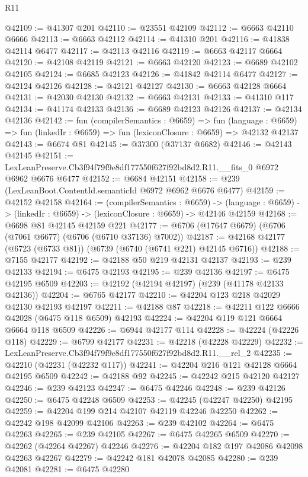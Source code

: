 \begin{lexlean}{R11}
\begin{coremodule}
@42109 := @41307 @201
@42110 := @23551 @42109
@42112 := @6663 @42110 @6666
@42113 := @6663 @42112
@42114 := @41310 @201
@42116 := @41838 @42114 @6477
@42117 := @42113 @42116
@42119 := @6663 @42117 @6664
@42120 := @42108 @42119
@42121 := @6663 @42120
@42123 := @6689 @42102 @42105
@42124 := @6685 @42123
@42126 := @41842 @42114 @6477
@42127 := @42124 @42126
@42128 := @42121 @42127
@42130 := @6663 @42128 @6664
@42131 := @42030 @42130
@42132 := @6663 @42131
@42133 := @41310 @117
@42134 := @41174 @42133
@42136 := @6689 @42123 @42126
@42137 := @42134 @42136
@42142 := fun (compilerSemantics : @6659) =>
  fun (language : @6659) => fun (linkedIr : @6659) => fun (lexiconClosure : @6659) => @42132 @42137
@42143 := @6674 @81
@42145 := @37300 (@37137 @6682)
@42146 := @42143 @42145
@42151 := LexLeanPreserve.Cb3f94f79f9e8df177550f627f92bd8d2.R11.__fits_0 @6972 @6962 @6676 @6477
@42152 := @6684 @42151
@42158 := @239 (LexLeanBoot.ContentId.semanticId @6972 @6962 @6676 @6477)
@42159 := @42152 @42158
@42164 := (compilerSemantics : @6659) ->
  (language : @6659) -> (linkedIr : @6659) -> (lexiconClosure : @6659) -> @42146 @42159
@42168 := @6698 @81 @42145 @42159 @221
@42177 := @6706 (@17647 @6679) (@6706 (@7061 @6677) (@6706 (@6710 @37136) @7002))
@42187 := @42168 @42177 (@6723 (@6733 @81)) (@6739 (@6740 (@6741 @221) @42145 @6716))
@42188 := @7155 @42177
@42192 := @42188 @50 @219 @42131 @42137
@42193 := @239 @42133
@42194 := @6475 @42193
@42195 := @239 @42136
@42197 := @6475 @42195 @6509
@42203 := @42192 (@42194 @42197) (@239 (@41178 @42133 @42136))
@42204 := @6765 @42177
@42210 := @42204 @123 @218 @42029 @42130 @42193 @42197
@42211 := @42188 @87
@42218 := @42211 @122 @6666 @42028 (@6475 @118 @6509) @42193
@42224 := @42204 @119 @121 @6664 @6664 @118 @6509
@42226 := @6944 @42177 @114
@42228 := @42224 (@42226 @118)
@42229 := @6799 @42177
@42231 := @42218 (@42228 @42229)
@42232 := LexLeanPreserve.Cb3f94f79f9e8df177550f627f92bd8d2.R11.__rel_2
@42235 := @42210 (@42231 (@42232 @117))
@42241 := @42204 @216 @121 @42128 @6664 @42195 @6509
@42242 := @42188 @92
@42245 := @42242 @215 @42120 @42127
@42246 := @239 @42123
@42247 := @6475 @42246
@42248 := @239 @42126
@42250 := @6475 @42248 @6509
@42253 := @42245 (@42247 @42250) @42195
@42259 := @42204 @199 @214 @42107 @42119 @42246 @42250
@42262 := @42242 @198 @42099 @42106
@42263 := @239 @42102
@42264 := @6475 @42263
@42265 := @239 @42105
@42267 := @6475 @42265 @6509
@42270 := @42262 (@42264 @42267) @42246
@42276 := @42204 @182 @197 @42086 @42098 @42263 @42267
@42279 := @42242 @181 @42078 @42085
@42280 := @239 @42081
@42281 := @6475 @42280

\end{coremodule}
\end{lexlean}
